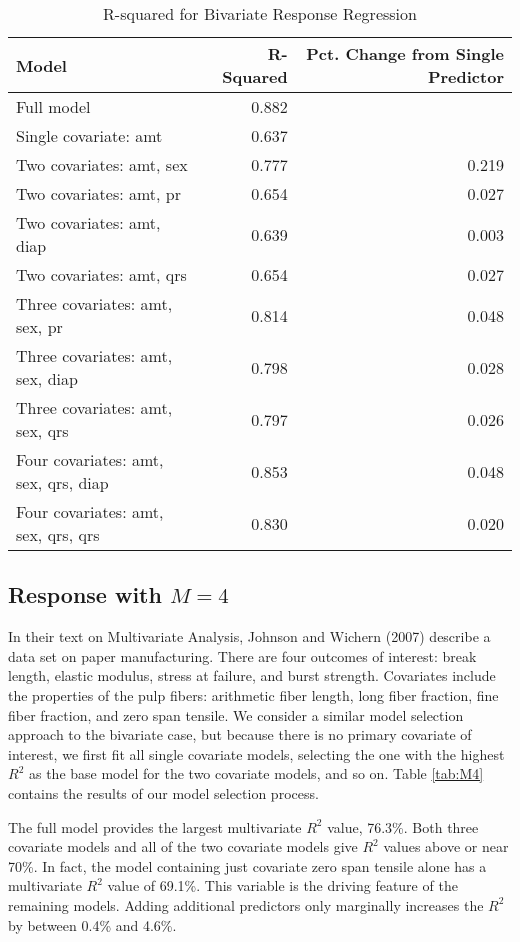 \begin{table}

\caption{\label{tab:bivar}R-squared for Bivariate Response Regression}
\centering
\begin{tabular}[t]{l|r|r}
\hline
Model & R-Squared & Pct. Change from Single Predictor\\
\hline
Full model & 0.882 & \\
\hline
Single covariate: amt & 0.637 & \\
\hline
Two covariates: amt, sex & 0.777 & 0.219\\
\hline
Two covariates: amt, pr & 0.654 & 0.027\\
\hline
Two covariates: amt, diap & 0.639 & 0.003\\
\hline
Two covariates: amt, qrs & 0.654 & 0.027\\
\hline
Three covariates: amt, sex, pr & 0.814 & 0.048\\
\hline
Three covariates: amt, sex, diap & 0.798 & 0.028\\
\hline
Three covariates: amt, sex, qrs & 0.797 & 0.026\\
\hline
Four covariates: amt, sex, qrs, diap & 0.853 & 0.048\\
\hline
Four covariates: amt, sex, qrs, qrs & 0.830 & 0.020\\
\hline
\end{tabular}
\end{table}

\hypertarget{response-with-m-4}{%
\subsection{\texorpdfstring{Response with \(M = 4\)}{Response with M = 4}}\label{response-with-m-4}}

In their text on Multivariate Analysis, Johnson and Wichern (2007) describe a data set on paper manufacturing. There are four outcomes of interest: break length, elastic modulus, stress at failure, and burst strength. Covariates include the properties of the pulp fibers: arithmetic fiber length, long fiber fraction, fine fiber fraction, and zero span tensile. We consider a similar model selection approach to the bivariate case, but because there is no primary covariate of interest, we first fit all single covariate models, selecting the one with the highest \(R^2\) as the base model for the two covariate models, and so on. Table \ref{tab:M4} contains the results of our model selection process.

The full model provides the largest multivariate \(R^2\) value, 76.3\%. Both three covariate models and all of the two covariate models give \(R^2\) values above or near 70\%. In fact, the model containing just covariate zero span tensile alone has a multivariate \(R^2\) value of 69.1\%. This variable is the driving feature of the remaining models. Adding additional predictors only marginally increases the \(R^2\) by between 0.4\% and 4.6\%.

